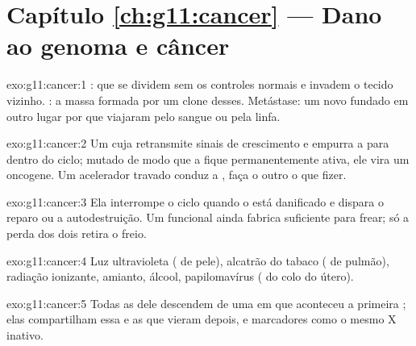 \section*{Capítulo \ref{ch:g11:cancer} --- Dano ao genoma e câncer}

\begin{solution}{exo:g11:cancer:1}
:  que se dividem sem os controles normais e invadem o
tecido vizinho. : a massa formada por um clone desses. Metástase:
um  novo fundado em outro lugar por  que viajaram pelo
sangue ou pela linfa.
\end{solution}

\begin{solution}{exo:g11:cancer:2}
Um  cuja  retransmite sinais de crescimento e empurra a
 para dentro do ciclo; mutado de modo que a  fique
permanentemente ativa, ele vira um oncogene. Um acelerador travado
conduz a , faça o outro  o que fizer.
\end{solution}

\begin{solution}{exo:g11:cancer:3}
Ela interrompe o ciclo quando o  está danificado e dispara o reparo
ou a autodestruição. Um  funcional ainda fabrica 
suficiente para frear; só a perda dos dois retira o freio.
\end{solution}

\begin{solution}{exo:g11:cancer:4}
Luz ultravioleta ( de pele), alcatrão do tabaco ( de
pulmão), radiação ionizante, amianto, álcool, papilomavírus ( do
colo do útero).
\end{solution}

\begin{solution}{exo:g11:cancer:5}
Todas as  dele descendem de uma  em que aconteceu a
primeira ; elas compartilham essa  e as que vieram
depois, e marcadores como o mesmo  X inativo.
\end{solution}

